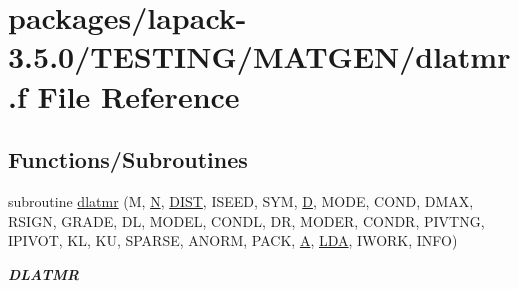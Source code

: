 \hypertarget{dlatmr_8f}{}\section{packages/lapack-\/3.5.0/\+T\+E\+S\+T\+I\+N\+G/\+M\+A\+T\+G\+E\+N/dlatmr.f File Reference}
\label{dlatmr_8f}
\subsection*{Functions/\+Subroutines}
\begin{DoxyCompactItemize}
\item 
subroutine \hyperlink{group__double__matgen_ga7a230b091365727c700ff3cf446a14b7}{dlatmr} (M, \hyperlink{polmisc_8c_a0240ac851181b84ac374872dc5434ee4}{N}, \hyperlink{superlu__enum__consts_8h_af00a42ecad444bbda75cde1b64bd7e72ac04fbbdf0d80a4ad25e565541deeebd7}{D\+I\+S\+T}, I\+S\+E\+E\+D, S\+Y\+M, \hyperlink{odrpack_8h_a7dae6ea403d00f3687f24a874e67d139}{D}, M\+O\+D\+E, C\+O\+N\+D, D\+M\+A\+X, R\+S\+I\+G\+N, G\+R\+A\+D\+E, D\+L, M\+O\+D\+E\+L, C\+O\+N\+D\+L, D\+R, M\+O\+D\+E\+R, C\+O\+N\+D\+R, P\+I\+V\+T\+N\+G, I\+P\+I\+V\+O\+T, K\+L, K\+U, S\+P\+A\+R\+S\+E, A\+N\+O\+R\+M, P\+A\+C\+K, \hyperlink{classA}{A}, \hyperlink{example__user_8c_ae946da542ce0db94dced19b2ecefd1aa}{L\+D\+A}, I\+W\+O\+R\+K, I\+N\+F\+O)
\begin{DoxyCompactList}\small\item\em {\bfseries D\+L\+A\+T\+M\+R} \end{DoxyCompactList}\end{DoxyCompactItemize}
